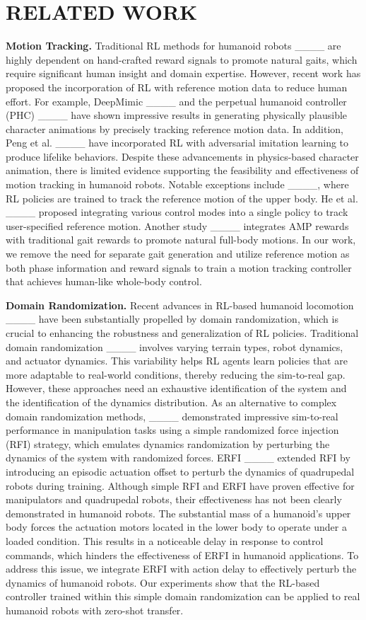 \section{RELATED WORK}
\label{related work}
\textbf{Motion Tracking.} Traditional RL methods for humanoid robots ____ are highly dependent on hand-crafted reward signals to promote natural gaits, which require significant human insight and domain expertise. However, recent work has proposed the incorporation of RL with reference motion data to reduce human effort. For example, DeepMimic ____ and the perpetual humanoid controller (PHC) ____ have shown impressive results in generating physically plausible character animations by precisely tracking reference motion data. In addition, Peng et al. ____ have incorporated RL with adversarial imitation learning to produce lifelike behaviors. Despite these advancements in physics-based character animation, there is limited evidence supporting the feasibility and effectiveness of motion tracking in humanoid robots. Notable exceptions include ____, where RL policies are trained to track the reference motion of the upper body. He et al. ____ proposed integrating various control modes into a single policy to track user-specified reference motion. Another study ____ integrates AMP rewards with traditional gait rewards to promote natural full-body motions. In our work, we remove the need for separate gait generation and utilize reference motion as both phase information and reward signals to train a motion tracking controller that achieves human-like whole-body control.

\textbf{Domain Randomization.} Recent advances in RL-based humanoid locomotion ____ have been substantially propelled by domain randomization, which is crucial to enhancing the robustness and generalization of RL policies. Traditional domain randomization ____ involves varying terrain types, robot dynamics, and actuator dynamics. This variability helps RL agents learn policies that are more adaptable to real-world conditions, thereby reducing the sim-to-real gap. However, these approaches need an exhaustive identification of the system and the identification of the dynamics distribution. As an alternative to complex domain randomization methods, ____ demonstrated impressive sim-to-real performance in manipulation tasks using a simple randomized force injection (RFI) strategy, which emulates dynamics randomization by perturbing the dynamics of the system with randomized forces. ERFI ____ extended RFI by introducing an episodic actuation offset to perturb the dynamics of quadrupedal robots during training. Although simple RFI and ERFI have proven effective for manipulators and quadrupedal robots, their effectiveness has not been clearly demonstrated in humanoid robots. The substantial mass of a humanoid's upper body forces the actuation motors located in the lower body to operate under a loaded condition. This results in a noticeable delay in response to control commands, which hinders the effectiveness of ERFI in humanoid applications. To address this issue, we integrate ERFI with action delay to effectively perturb the dynamics of humanoid robots. Our experiments show that the RL-based controller trained within this simple domain randomization can be applied to real humanoid robots with zero-shot transfer.